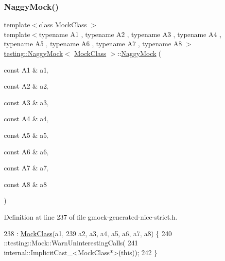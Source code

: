 \subsubsection{\texorpdfstring{Naggy\+Mock()}{NaggyMock()}\hspace{0.1cm}{\footnotesize\ttfamily [9/11]}}
{\footnotesize\ttfamily template$<$class Mock\+Class $>$ \\
template$<$typename A1 , typename A2 , typename A3 , typename A4 , typename A5 , typename A6 , typename A7 , typename A8 $>$ \\
\hyperlink{classtesting_1_1NaggyMock}{testing\+::\+Naggy\+Mock}$<$ \hyperlink{classMockClass}{Mock\+Class} $>$\+::\hyperlink{classtesting_1_1NaggyMock}{Naggy\+Mock} (\begin{DoxyParamCaption}\item[{const A1 \&}]{a1,  }\item[{const A2 \&}]{a2,  }\item[{const A3 \&}]{a3,  }\item[{const A4 \&}]{a4,  }\item[{const A5 \&}]{a5,  }\item[{const A6 \&}]{a6,  }\item[{const A7 \&}]{a7,  }\item[{const A8 \&}]{a8 }\end{DoxyParamCaption})\hspace{0.3cm}{\ttfamily [inline]}}



Definition at line 237 of file gmock-\/generated-\/nice-\/strict.\+h.


\begin{DoxyCode}
238                                                               : \hyperlink{classMockClass}{MockClass}(a1,
239       a2, a3, a4, a5, a6, a7, a8) \{
240     ::testing::Mock::WarnUninterestingCalls(
241         internal::ImplicitCast\_<MockClass*>(\textcolor{keyword}{this}));
242   \}
\end{DoxyCode}
\mbox{\label{classtesting_1_1NaggyMock_a786f31ade7b8b9f6e78e07f51cc0e14b}} 
